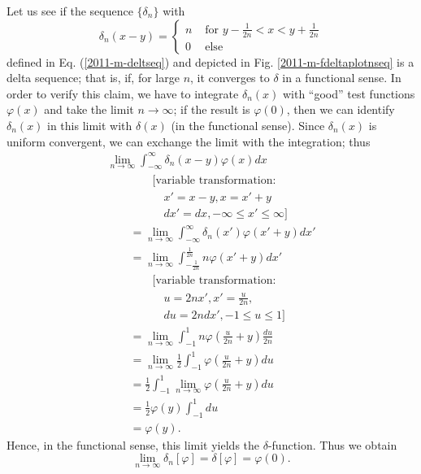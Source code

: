 {
\color{blue}
\bexample

Let us see if the sequence $\{ \delta_n\}$ with
$$\delta_n(x-y) =
\left\{
\begin{array}{rl}
n & \textrm{ for } y - \frac{1}{2n}  < x < y+ \frac{1}{2n} \\
0& \textrm{ else }
\end{array}
\right.$$
defined in Eq. (\ref{2011-m-deltseq}) and depicted
in Fig.
\ref{2011-m-fdeltaplotnseq}
is a delta sequence;
that is, if, for large $n$, it converges to $\delta$ in a functional sense.
In order to verify this claim, we have to integrate $\delta_n(x)$
with ``good'' test functions $ \varphi (x)$ and take the limit $n\rightarrow \infty$;
if the result is $ \varphi (0)$, then we can identify $\delta_n(x)$ in this limit with $\delta (x)$
(in the functional sense).
Since $\delta_n(x)$ is uniform convergent, we can exchange the limit with the integration; thus
\begin{equation}
\begin{split}
\lim_{n\rightarrow \infty} \int_{-\infty}^\infty \delta_n(x-y) \varphi (x) dx \\
\qquad\qquad\textrm{[variable transformation:}  \\
\qquad\qquad\quad  x'=x-y, x= x'+y   \\
\qquad\qquad\quad  dx' =  dx, -\infty\le x' \le \infty \textrm{]} \\
\qquad =
\lim_{n\rightarrow \infty} \int_{-\infty}^\infty \delta_n(x') \varphi (x'+y) dx' \\
\qquad =
\lim_{n\rightarrow \infty} \int_{- \frac{1}{2n}}^\frac{1}{2n} n \varphi (x'+y) dx'    \\
\qquad\qquad\textrm{[variable transformation:}  \\
\qquad\qquad\quad  u=2nx', x'=\frac{u}{2n},    \\
\qquad\qquad\quad  du = 2n dx', -1\le u \le 1\textrm{]} \\
\qquad = \lim_{n\rightarrow \infty} \int_{- 1}^1 n \varphi (\frac{ u}{2n}+y) \frac{du}{2n}       \\
\qquad =
\lim_{n\rightarrow \infty} \frac{1}{2} \int_{- 1}^1 \varphi (\frac{ u}{2n}+y) du     \\
\qquad =
\frac{1}{2} \int_{- 1}^1 \lim_{n\rightarrow \infty} \varphi (\frac{ u}{2n}+y) du    \\
\qquad =
\frac{1}{2} \varphi (y) \int_{- 1}^1  du     \\
\qquad =
\varphi (y)
.
\end{split}
\end{equation}
Hence, in the functional sense,
this limit yields the $\delta$-function.
Thus we obtain
$$
\lim_{n\rightarrow \infty} \delta_n[\varphi] = \delta [\varphi] = \varphi (0).
$$
\eexample
}

